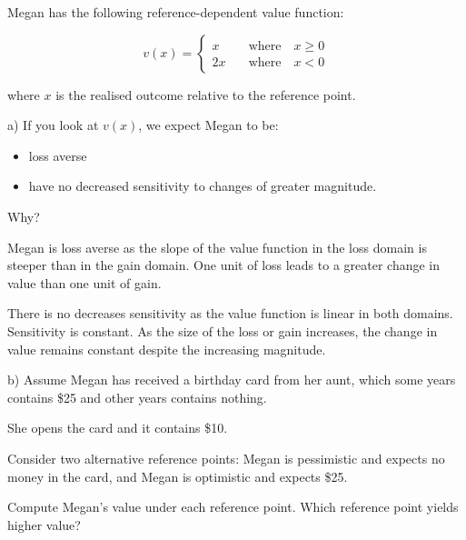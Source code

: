 \documentclass[
  letterpaper,
  DIV=11,
  numbers=noendperiod]{scrreprt}
\providecommand{\tightlist}{%
  \setlength{\itemsep}{0pt}\setlength{\parskip}{0pt}}\usepackage{longtable,booktabs,array}
\begin{document}
Megan has the following reference-dependent value function:

\[
v(x)=\left\{\begin{matrix}
x \quad &\textrm{where} \quad x \geq 0\\
2x \quad &\textrm{where} \quad x < 0
\end{matrix}\right.
\]

where \(x\) is the realised outcome relative to the reference point.

a) If you look at \(v(x)\), we expect Megan to be:

\begin{itemize}
\tightlist
\item
  loss averse
\item
  have no decreased sensitivity to changes of greater magnitude.
\end{itemize}

Why?

\begin{tcolorbox}[enhanced jigsaw, title=\textcolor{quarto-callout-tip-color}{\faLightbulb}\hspace{0.5em}{Answer}, toprule=.15mm, colback=white, breakable, titlerule=0mm, colframe=quarto-callout-tip-color-frame, coltitle=black, opacityback=0, rightrule=.15mm, colbacktitle=quarto-callout-tip-color!10!white, bottomtitle=1mm, opacitybacktitle=0.6, arc=.35mm, bottomrule=.15mm, toptitle=1mm, leftrule=.75mm, left=2mm]

Megan is loss averse as the slope of the value function in the loss
domain is steeper than in the gain domain. One unit of loss leads to a
greater change in value than one unit of gain.

There is no decreases sensitivity as the value function is linear in
both domains. Sensitivity is constant. As the size of the loss or gain
increases, the change in value remains constant despite the increasing
magnitude.

\end{tcolorbox}

b) Assume Megan has received a birthday card from her aunt, which some
years contains \$25 and other years contains nothing.

She opens the card and it contains \$10.

Consider two alternative reference points: Megan is pessimistic and
expects no money in the card, and Megan is optimistic and expects \$25.

Compute Megan's value under each reference point. Which reference point
yields higher value?
\end{document}

